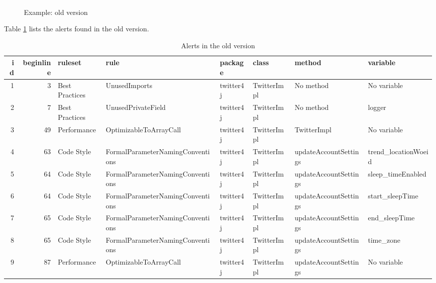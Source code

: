 \documentclass[
]{article}
\begin{document}
\begin{landscape}
\normalsize

\begin{figure}
\centering
\includegraphics{figures/fake.png}
\caption{Example: old version\label{old_example}}
\end{figure}

\end{landscape}

\newpage

Table \ref{alerts_old} lists the alerts found in the old version.

\small

\begin{table}[!h]

\caption{\label{tab:show alerts old}Alerts in the old version\label{alerts_old}}
\centering
\fontsize{6}{8}\selectfont
\begin{tabular}[t]{r|r|l|l|l|l|l|l}
\hline
id & beginline & ruleset & rule & package & class & method & variable\\
\hline
1 & 3 & Best Practices & UnusedImports & twitter4j & TwitterImpl & No method & No variable\\
\hline
2 & 7 & Best Practices & UnusedPrivateField & twitter4j & TwitterImpl & No method & logger\\
\hline
3 & 49 & Performance & OptimizableToArrayCall & twitter4j & TwitterImpl & TwitterImpl & No variable\\
\hline
4 & 63 & Code Style & FormalParameterNamingConventions & twitter4j & TwitterImpl & updateAccountSettings & trend\_locationWoeid\\
\hline
5 & 64 & Code Style & FormalParameterNamingConventions & twitter4j & TwitterImpl & updateAccountSettings & sleep\_timeEnabled\\
\hline
6 & 64 & Code Style & FormalParameterNamingConventions & twitter4j & TwitterImpl & updateAccountSettings & start\_sleepTime\\
\hline
7 & 65 & Code Style & FormalParameterNamingConventions & twitter4j & TwitterImpl & updateAccountSettings & end\_sleepTime\\
\hline
8 & 65 & Code Style & FormalParameterNamingConventions & twitter4j & TwitterImpl & updateAccountSettings & time\_zone\\
\hline
9 & 87 & Performance & OptimizableToArrayCall & twitter4j & TwitterImpl & updateAccountSettings & No variable\\
\hline
\end{tabular}
\end{table}
\end{document}
